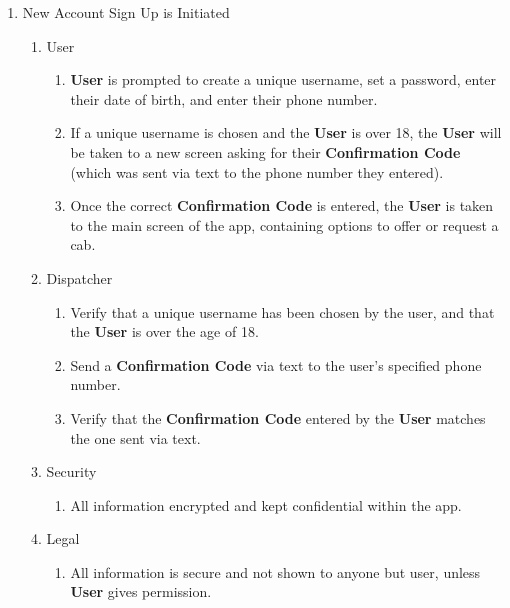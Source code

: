 \documentclass[english]{article}
\begin{document}
\begin{enumerate}[{BE}1.]
	\item New Account Sign Up is Initiated	
	\begin{enumerate}[{VP2}.1]
		\item User
			\begin{enumerate}
				\item \textbf{User} is prompted to create a unique username, set a password, enter their date of birth, and enter their phone number.
				\item If a unique username is chosen and the \textbf{User} is over 18, the \textbf{User} will be taken to a new screen asking for their \textbf{Confirmation Code} (which was sent via text to the phone number they entered).
				\item Once the correct \textbf{Confirmation Code} is entered, the \textbf{User} is taken to the main screen of the app, containing options to offer or request a cab. 
			\end{enumerate}
		\item Dispatcher
			\begin{enumerate}
				\item Verify that a unique username has been chosen by the user, and that the \textbf{User} is over the age of 18.
				\item Send a \textbf{Confirmation Code} via text to the user's specified phone number.
				\item Verify that the \textbf{Confirmation Code} entered by the \textbf{User} matches the one sent via text.
			\end{enumerate}
		\item Security
			\begin{enumerate}
				\item All information encrypted and kept confidential within the app.
			\end{enumerate}
		\item Legal
			\begin{enumerate}
				\item All information is secure and not shown to anyone but user, unless \textbf{User} gives permission.
			\end{enumerate}
	\end{enumerate}


\end{enumerate}
\end{document}
